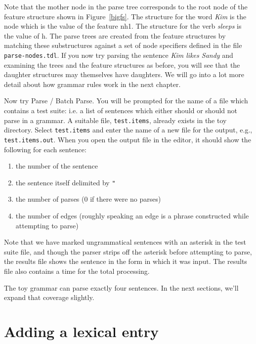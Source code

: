 \documentclass[12pt]{report}
\newcommand{\filename}[1]{{\tt #1}}
\newcommand{\lkbmenucommand}{{\bf}}
\begin{document}
Note that the mother node in the parse tree corresponds
to the root node of the feature structure shown in Figure~\ref{bigfs}.
The structure for the word {\it Kim} is the node which
is the value of the feature {\feature nh1}.  The structure for the
verb {\it sleeps} is the value of {\feature h}.
The parse trees are created from the feature structures
by matching these substructures against a set of node specifiers
defined in the file \filename{parse-nodes.tdl}.
If you now try parsing the sentence {\it Kim likes Sandy}
and examining the trees and the feature structures as before, you
will see that the daughter structures may themselves have daughters.
We will go into a lot more detail about how grammar rules work
in the next chapter.

Now try {\lkbmenucommand Parse} / {\lkbmenucommand Batch Parse}.  
You will be prompted for the
name of a file which contains a test suite: i.e. a list of sentences
which either should or should not parse in a grammar.  A suitable file,
\filename{test.items}, already exists in the toy directory.  Select 
\filename{test.items} and enter the name of a new file for the output,
e.g., \filename{test.items.out}.  When you open the output file in
the editor, it should show the following for each sentence:
\begin{enumerate}
\item the number of the sentence
\item the sentence itself delimited by {\tt "}
\item the number of parses (0 if there were no parses)
\item the number of edges (roughly speaking an edge is a
phrase constructed while attempting to parse) 
\end{enumerate}
Note that we have marked ungrammatical sentences with an asterisk
in the test suite file, and though the parser strips off the asterisk before 
attempting to parse, the results file shows the sentence in the
form in which it was input. 
The results file also contains a time for the total processing.

The toy grammar can parse exactly four 
sentences.  In the next sections, we'll expand that coverage slightly.


\section{Adding a lexical entry}
\end{document}
